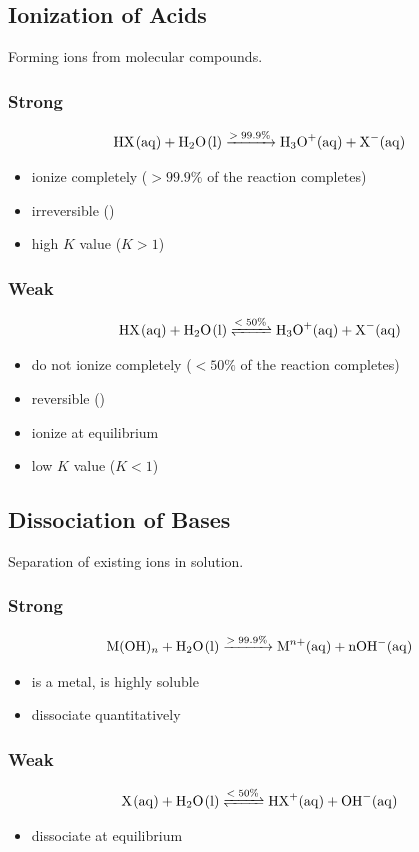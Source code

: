 \documentclass[a4paper,12pt]{article}
\begin{document}
\subsection{Ionization of Acids}
Forming ions from molecular compounds.

\subsubsection{Strong}
\Large
$$\ce{HX(aq) + H2O(l) ->[$>99.9\%$] H3O+(aq) + X-(aq)}$$
\normalsize
\begin{itemize}
    \item{ionize completely ($>99.9\%$ of the reaction completes)}
    \item{irreversible (\ce{->})}
    \item{high $K$ value ($K > 1$)}
\end{itemize}

\subsubsection{Weak}
\Large
$$\ce{HX(aq) + H2O(l) <=>[$<50\%$] H3O+(aq) + X-(aq)}$$
\normalsize
\begin{itemize}
    \item{do not ionize completely ($<50\%$ of the reaction completes)}
    \item{reversible (\ce{<=>})}
    \item{ionize at equilibrium}
    \item{low $K$ value ($K < 1$)}
\end{itemize}

\subsection{Dissociation of Bases}
Separation of existing ions in solution.

\subsubsection{Strong}
\Large
$$\ce{M(OH)_n + H2O(l) ->[$>99.9\%$] M^{n+}(aq) + nOH-(aq)}$$
\normalsize
\begin{itemize}
    \item{ is a metal,  is highly soluble}
    \item{dissociate quantitatively}
\end{itemize}

\subsubsection{Weak}
\Large
$$\ce{X(aq) + H2O(l) <=>[$<50\%$] HX+(aq) + OH-(aq)}$$
\normalsize
\begin{itemize}
    \item{dissociate at equilibrium}
\end{itemize}
\end{document}

